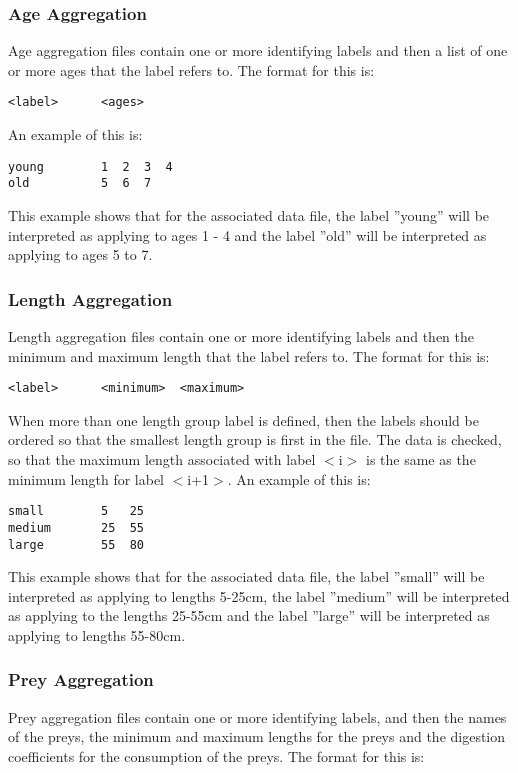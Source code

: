 \documentclass[10pt,twoside]{book}
\begin{document}
\subsubsection{Age Aggregation}
Age aggregation files contain one or more identifying labels and then a list of one or more ages that the label refers to.  The format for this is:

{\small\begin{verbatim}
<label>      <ages>
\end{verbatim}}

An example of this is:

{\small\begin{verbatim}
young        1  2  3  4
old          5  6  7
\end{verbatim}}

This example shows that for the associated data file, the label ''young'' will be interpreted as applying to ages 1 - 4 and the label ''old'' will be interpreted as applying to ages 5 to 7.

\subsubsection{Length Aggregation}
Length aggregation files contain one or more identifying labels and then the minimum and maximum length that the label refers to.  The format for this is:

{\small\begin{verbatim}
<label>      <minimum>  <maximum>
\end{verbatim}}

When more than one length group label is defined, then the labels should be ordered so that the smallest length group is first in the file.  The data is checked, so that the maximum length associated with label $<$i$>$ is the same as the minimum length for label $<$i+1$>$.  An example of this is:

{\small\begin{verbatim}
small        5   25
medium       25  55
large        55  80
\end{verbatim}}

This example shows that for the associated data file, the label ''small'' will be interpreted as applying to lengths 5-25cm, the label ''medium'' will be interpreted as applying to the lengths 25-55cm and the label ''large'' will be interpreted as applying to lengths 55-80cm.

\subsubsection{Prey Aggregation}
Prey aggregation files contain one or more identifying labels, and then the names of the preys, the minimum and maximum lengths for the preys and the digestion coefficients for the consumption of the preys.  The format for this is:
\end{document}
